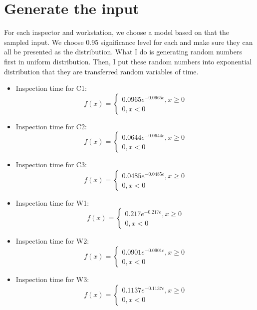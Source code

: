 \documentclass{article}
\begin{document}
\section{Generate the input}

For each inspector and workstation, we choose a model based on that the sampled input. We choose 0.95 significance level for each and make sure they can all be presented as the distribution. What I do is generating random numbers first in uniform distribution. Then, I put these random numbers into exponential distribution that they are transferred random variables of time.

\begin{itemize}
\item Inspection time for C1:
\begin{equation}
f(x) = \left\{
\begin{array}{rl}
0.0965 e^{-0.0965 e}, x\geq 0\\
0, x<0
\end{array}
\right.
\end{equation}
\item Inspection time for C2:
\begin{equation}
f(x) = \left\{
\begin{array}{rl}
0.0644 e^{-0.0644 e}, x\geq 0\\
0, x<0
\end{array}
\right.
\end{equation}
\item Inspection time for C3:
\begin{equation}
f(x) = \left\{
\begin{array}{rl}
0.0485 e^{-0.0485 e}, x\geq 0\\
0, x<0
\end{array}
\right.
\end{equation}
\item Inspection time for W1:
\begin{equation}
f(x) = \left\{
\begin{array}{rl}
0.217 e^{-0.217 e}, x\geq 0\\
0, x<0
\end{array}
\right.
\end{equation}
\item Inspection time for W2:
\begin{equation}
f(x) = \left\{
\begin{array}{rl}
0.0901 e^{-0.0901 e}, x\geq 0\\
0, x<0
\end{array}
\right.
\end{equation}
\item Inspection time for W3:
\begin{equation}
f(x) = \left\{
\begin{array}{rl}
0.1137 e^{-0.1137 e}, x\geq 0\\
0, x<0
\end{array}
\right.
\end{equation}
\end{itemize}
\end{document}
